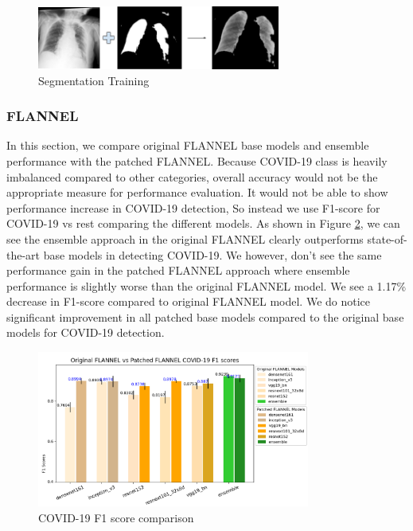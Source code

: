 \documentclass{sigkddExp}
\begin{document}
\begin{figure}[h]
    \includegraphics[width=8cm]{../doc/images/segmentation_training.png}
    \caption{Segmentation Training}
    \label{fig:segtrain}
\end{figure}

\subsubsection{FLANNEL}

In this section, we compare original FLANNEL base models and ensemble
performance with the patched FLANNEL. Because COVID-19 class is heavily
imbalanced compared to other categories, overall accuracy would not be the
appropriate measure for performance evaluation. It would not be able to show
performance increase in COVID-19 detection, So instead we use F1-score for
COVID-19 vs rest comparing the different models. As shown in Figure
\ref{fig:f1score}, we can see the ensemble approach in the original FLANNEL
clearly outperforms state-of-the-art base models in detecting COVID-19. We
however, don’t see the same performance gain in the patched FLANNEL approach
where ensemble performance is slightly worse than the original FLANNEL model. We
see a 1.17\% decrease in F1-score compared to original FLANNEL model. We do
notice significant improvement in all patched base models compared to the
original base models for COVID-19 detection.

\begin{figure}[h]
    \centering
    \includegraphics[width=0.8\textwidth]{../doc/images/original_vs_patched_flannel_f1.png}
    \caption{COVID-19 F1 score comparison}
    \label{fig:f1score}
\end{figure}
\end{document}
